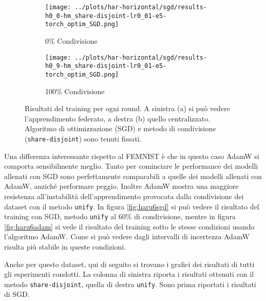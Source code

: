 \begin{figure}[htp]  %
    \centering
    \begin{subfigure}[b]{0.49\textwidth}
        \centering
        \texttt{[image: ../plots/har-horizontal/sgd/results-h0\_0-hm\_share-disjoint-lr0\_01-e5-torch\_optim\_SGD.png]}
        \caption{0\% Condivisione}
        \label{fig:hars0sgd}
    \end{subfigure}
    \hfill
    \begin{subfigure}[b]{0.49\textwidth}
        \centering
        \texttt{[image: ../plots/har-horizontal/sgd/results-h0\_9-hm\_share-disjoint-lr0\_01-e5-torch\_optim\_SGD.png]}
        \caption{100\% Condivisione}
        \label{fig:hars9sgd}
    \end{subfigure}
    
    \caption{
        Risultati del training per ogni round. A sinistra (a) si può 
        vedere l'apprendimento federato, a destra (b) quello centralizzato.
        Algoritmo di ottimizzazione (SGD) e metodo di condivisione 
        (\texttt{share-disjoint}) sono tenuti fissati.
    }
\end{figure}


Una differenza interessante rispetto al FEMNIST è che in questo 
caso AdamW si comporta sensibilmente meglio. Tanto per cominciare
le performance dei modelli allenati con SGD sono perfettamente 
comparabili a quelle dei modelli allenati con AdamW, anziché 
performare peggio. Inoltre AdamW mostra una maggiore resistenza 
all'instabilità dell'apprendimento provocata dalla condivisione 
dei dataset con il metodo \texttt{unify}. In figura 
\ref{fig:haru6sgd} si può vedere il risultato del training con SGD,
metodo \texttt{unify} al 60\% di condivisione, mentre in figura 
\ref{fig:haru6adam} si vede il risultato del training sotto le 
stesse condizioni usando l'algoritmo AdamW. Come si può vedere 
dagli intervalli di incertezza AdamW risulta più stabile in 
queste condizioni.

Anche per questo dataset, qui di seguito si trovano i grafici dei
risultati di tutti gli esperimenti condotti. La colonna di sinistra 
riporta i risultati ottenuti con il metodo \texttt{share-disjoint}, 
quella di destra \texttt{unify}. Sono prima riportati i risultati 
di SGD.

